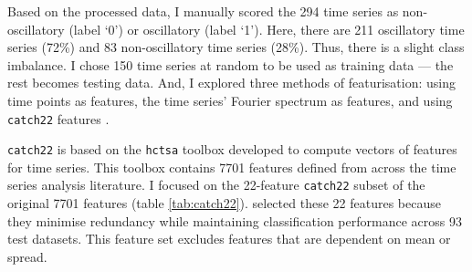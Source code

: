 Based on the processed data, I manually scored the 294 time series as non-oscillatory (label `0') or oscillatory (label `1').
Here, there are 211 oscillatory time series (72\%) and 83 non-oscillatory time series (28\%).
Thus, there is a slight class imbalance.
I chose 150 time series at random to be used as training data --- the rest becomes testing data.
And, I explored three methods of featurisation: using time points as features, the time series' Fourier spectrum as features, and using \texttt{catch22} features \parencite{lubbaCatch22CAnonicalTimeseries2019}.

\texttt{catch22} is based on the \texttt{hctsa} toolbox \parencite{fulcherHctsaComputationalFramework2017} developed to compute vectors of features for time series.
This toolbox contains 7701 features defined from across the time series analysis literature.
I focused on the 22-feature \texttt{catch22} subset of the original 7701 features (table \ref{tab:catch22}).
\textcite{lubbaCatch22CAnonicalTimeseries2019} selected these 22 features because they minimise redundancy while maintaining classification performance across 93 test datasets.
This feature set excludes features that are dependent on mean or spread.

